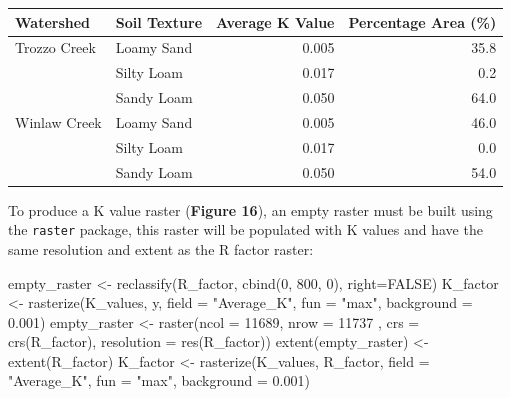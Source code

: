 \documentclass[
]{article}
\newenvironment{Shaded}{\begin{snugshade}}{\end{snugshade}}
\newcommand{\AttributeTok}[1]{\textcolor[rgb]{0.77,0.63,0.00}{#1}}
\newcommand{\ConstantTok}[1]{\textcolor[rgb]{0.00,0.00,0.00}{#1}}
\newcommand{\DecValTok}[1]{\textcolor[rgb]{0.00,0.00,0.81}{#1}}
\newcommand{\FloatTok}[1]{\textcolor[rgb]{0.00,0.00,0.81}{#1}}
\newcommand{\FunctionTok}[1]{\textcolor[rgb]{0.00,0.00,0.00}{#1}}
\newcommand{\NormalTok}[1]{#1}
\newcommand{\OtherTok}[1]{\textcolor[rgb]{0.56,0.35,0.01}{#1}}
\newcommand{\StringTok}[1]{\textcolor[rgb]{0.31,0.60,0.02}{#1}}
\begin{document}
\begin{table}
\centering
\begin{tabular}[t]{l|l|r|r}
\hline
Watershed & Soil Texture & Average K Value & Percentage Area (\%)\\
\hline
Trozzo Creek & Loamy Sand & 0.005 & 35.8\\
\hline
 & Silty Loam & 0.017 & 0.2\\
\hline
 & Sandy Loam & 0.050 & 64.0\\
\hline
Winlaw Creek & Loamy Sand & 0.005 & 46.0\\
\hline
 & Silty Loam & 0.017 & 0.0\\
\hline
 & Sandy Loam & 0.050 & 54.0\\
\hline
\end{tabular}
\end{table}

To produce a K value raster (\textbf{Figure 16}), an empty raster must be built using the \texttt{raster} package, this raster will be populated with K values and have the same resolution and extent as the R factor raster:

\begin{Shaded}
\begin{Highlighting}[]
\NormalTok{empty\_raster }\OtherTok{\textless{}{-}} \FunctionTok{reclassify}\NormalTok{(R\_factor, }\FunctionTok{cbind}\NormalTok{(}\DecValTok{0}\NormalTok{, }\DecValTok{800}\NormalTok{, }\DecValTok{0}\NormalTok{), }\AttributeTok{right=}\ConstantTok{FALSE}\NormalTok{)}
\NormalTok{K\_factor }\OtherTok{\textless{}{-}} \FunctionTok{rasterize}\NormalTok{(K\_values, y, }\AttributeTok{field =} \StringTok{"Average\_K"}\NormalTok{, }
                      \AttributeTok{fun =} \StringTok{"max"}\NormalTok{, }\AttributeTok{background =} \FloatTok{0.001}\NormalTok{)}
\NormalTok{empty\_raster }\OtherTok{\textless{}{-}} \FunctionTok{raster}\NormalTok{(}\AttributeTok{ncol =} \DecValTok{11689}\NormalTok{, }\AttributeTok{nrow =} \DecValTok{11737}\NormalTok{ , }
                       \AttributeTok{crs =} \FunctionTok{crs}\NormalTok{(R\_factor), }\AttributeTok{resolution =} \FunctionTok{res}\NormalTok{(R\_factor))}
\FunctionTok{extent}\NormalTok{(empty\_raster) }\OtherTok{\textless{}{-}} \FunctionTok{extent}\NormalTok{(R\_factor)}
\NormalTok{K\_factor }\OtherTok{\textless{}{-}} \FunctionTok{rasterize}\NormalTok{(K\_values, R\_factor, }\AttributeTok{field =} \StringTok{"Average\_K"}\NormalTok{,}
                      \AttributeTok{fun =} \StringTok{"max"}\NormalTok{, }\AttributeTok{background =} \FloatTok{0.001}\NormalTok{)}
\end{Highlighting}
\end{Shaded}
\end{document}

